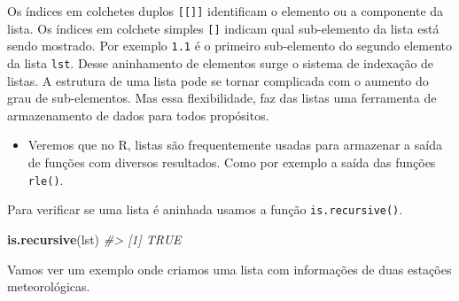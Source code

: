 \documentclass[]{book}
\newenvironment{Shaded}{\begin{snugshade}}{\end{snugshade}}
\newcommand{\KeywordTok}[1]{\textcolor[rgb]{0.13,0.29,0.53}{\textbf{#1}}}
\newcommand{\CommentTok}[1]{\textcolor[rgb]{0.56,0.35,0.01}{\textit{#1}}}
\newcommand{\NormalTok}[1]{#1}
\newenvironment{rmdblock}[1]
  {\begin{shaded*}
  \begin{itemize}
  \renewcommand{\labelitemi}{
    \raisebox{-.7\height}[0pt][0pt]{
      {\setkeys{Gin}{width=3em,keepaspectratio}\texttt{[image: images/\#1]}}
    }
  }
  \item
  }
  {
  \end{itemize}
  \end{shaded*}
  }
\newenvironment{rmdtip}
  {\begin{rmdblock}{tip}}
  {\end{rmdblock}}
\begin{document}
Os índices em colchetes duplos \texttt{{[}{[}{]}{]}} identificam o
elemento ou a componente da lista. Os índices em colchete simples
\texttt{{[}{]}} indicam qual sub-elemento da lista está sendo mostrado.
Por exemplo \texttt{1.1} é o primeiro sub-elemento do segundo elemento
da lista \texttt{lst}. Desse aninhamento de elementos surge o sistema de
indexação de listas. A estrutura de uma lista pode se tornar complicada
com o aumento do grau de sub-elementos. Mas essa flexibilidade, faz das
listas uma ferramenta de armazenamento de dados para todos propósitos.

\begin{rmdtip}
Veremos que no R, listas são frequentemente usadas para armazenar a
saída de funções com diversos resultados. Como por exemplo a saída das
funções \texttt{rle()}.
\end{rmdtip}

Para verificar se uma lista é aninhada usamos a função
\texttt{is.recursive()}.

\begin{Shaded}
\begin{Highlighting}[]
\KeywordTok{is.recursive}\NormalTok{(lst)}
\CommentTok{#> [1] TRUE}
\end{Highlighting}
\end{Shaded}

Vamos ver um exemplo onde criamos uma lista com informações de duas
estações meteorológicas.
\end{document}

